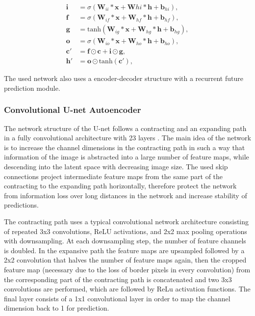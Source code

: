 \documentclass[12pt]{article}
\begin{document}
\begin{equation}
	\begin{aligned}
		\mathbf{i} &= \sigma(\mathbf{W}_{ii} * \mathbf{x} + \mathbf{W}{hi} * \mathbf{h} + \mathbf{b}_{hi}), \\
		\mathbf{f} &= \sigma(\mathbf{W}_{if} * \mathbf{x} + \mathbf{W}_{hf} * \mathbf{h} + \mathbf{b}_{hf}), \\
		\mathbf{g} &= \mathrm{tanh}(\mathbf{W}_{ig} * \mathbf{x} + \mathbf{W}_{hg} * \mathbf{h} + \mathbf{b}_{hg}), \\
		\mathbf{o} &= \sigma(\mathbf{W}_{io} * \mathbf{x} + \mathbf{W}_{ho} * \mathbf{h} + \mathbf{b}_{ho}), \\
		\mathbf{c'} &= \mathbf{f} \odot \mathbf{c} + \mathbf{i} \odot \mathbf{g}, \\
		\mathbf{h'} &= \mathbf{o} \odot \mathrm{tanh}(\mathbf{c'}),
	\end{aligned}
	\label{conv_lstm}
\end{equation}

The used network also uses a encoder-decoder structure with a recurrent future prediction module.

\subsubsection{Convolutional U-net Autoencoder}
The network structure of the U-net follows a contracting and an expanding path in a fully convolutional architecture with 23 layers \citep{ronneberger2015u}. The main idea of the network is to increase the channel dimensions in the contracting path in such a way that information of the image is abstracted into a large number of feature maps, while descending into the latent space with decreasing image size. The used skip connections project intermediate feature maps from the same part of the contracting to the expanding path horizontally, therefore protect the network from information loss over long distances in the network and increase stability of predictions.

The contracting path uses a typical convolutional network architecture consisting of repeated 3x3 convolutions, ReLU activations, and 2x2 max pooling operations with downsampling. At each downsampling step, the number of feature channels is doubled. In the expansive path the feature maps are upsampled followed by a 2x2 convolution that halves the number of feature maps again, then the cropped feature map (necessary due to the loss of border pixels in every convolution) from the corresponding part of the contracting path is concatenated and two 3x3 convolutions are performed, which are followed by ReLu activation functions. The final layer consists of a 1x1 convolutional layer in order to map the channel dimension back to 1 for prediction. 
\end{document}

